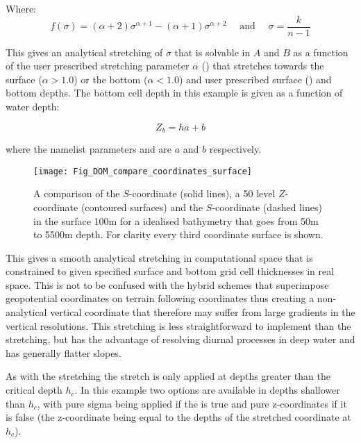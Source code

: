 \documentclass[../tex_main/NEMO_manual]{subfiles}
\begin{document}
Where:
\begin{equation} \label{eq:DOM_gamma}
f\left(\sigma\right)=\left(\alpha+2\right)\sigma^{\alpha+1}-\left(\alpha+1\right)\sigma^{\alpha+2} \quad \text{ and } \quad \sigma = \frac{k}{n-1} 
\end{equation}

This gives an analytical stretching of $\sigma$ that is solvable in $A$ and $B$ as a function of
the user prescribed stretching parameter $\alpha$ () that stretches towards
the surface ($\alpha > 1.0$) or the bottom ($\alpha < 1.0$) and
user prescribed surface () and bottom depths.
The bottom cell depth in this example is given as a function of water depth:

\begin{equation} \label{eq:DOM_zb}
Z_b= h a + b
\end{equation}

where the namelist parameters  and  are $a$ and $b$ respectively.

\begin{figure}[!ht]
   \texttt{[image: Fig\_DOM\_compare\_coordinates\_surface]}
   \caption{
     A comparison of the \citet{Song_Haidvogel_JCP94} $S$-coordinate (solid lines),
     a 50 level $Z$-coordinate (contoured surfaces) and
     the \citet{Siddorn_Furner_OM12} $S$-coordinate (dashed lines) in
     the surface 100m for a idealised bathymetry that goes from 50m to 5500m depth.
     For clarity every third coordinate surface is shown.}
    \label{fig:fig_compare_coordinates_surface}
\end{figure}

This gives a smooth analytical stretching in computational space that is constrained to
given specified surface and bottom grid cell thicknesses in real space.
This is not to be confused with the hybrid schemes that
superimpose geopotential coordinates on terrain following coordinates thus
creating a non-analytical vertical coordinate that
therefore may suffer from large gradients in the vertical resolutions.
This stretching is less straightforward to implement than the \citet{Song_Haidvogel_JCP94} stretching,
but has the advantage of resolving diurnal processes in deep water and has generally flatter slopes.

As with the \citet{Song_Haidvogel_JCP94} stretching the stretch is only applied at depths greater than
the critical depth $h_c$.
In this example two options are available in depths shallower than $h_c$,
with pure sigma being applied if the  is true and pure z-coordinates if it is false
(the z-coordinate being equal to the depths of the stretched coordinate at $h_c$).
\end{document}
